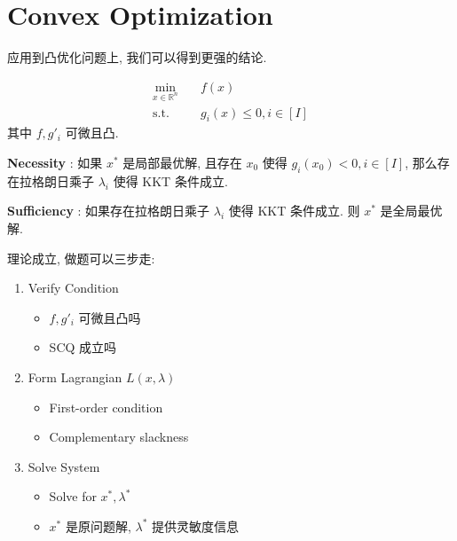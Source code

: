 \section{Convex Optimization}
应用到凸优化问题上, 我们可以得到更强的结论.
\begin{definition}
    \begin{align*}
        \min_{x \in \mathbb{R}^n} & \quad f(x) \\
        \text{s.t.} & \quad g_i(x) \leq 0, i\in [I] 
    \end{align*}
    其中 $f, g'_i$ 可微且凸. 
\end{definition}
\begin{proposition}
    \textbf{Necessity} : 如果 $x^*$ 是局部最优解, 且存在 $x_0$ 使得 $g_i(x_0) < 0, i \in [I]$, 那么存在拉格朗日乘子 $\lambda_i$ 使得 KKT 条件成立.

    \textbf{Sufficiency} : 如果存在拉格朗日乘子 $\lambda_i$ 使得 KKT 条件成立. 则 $x^*$ 是全局最优解.
\end{proposition}

理论成立, 做题可以三步走:
\begin{enumerate}
    \item Verify Condition
    \begin{itemize}
        \item $f,g'_i$ 可微且凸吗
        \item SCQ 成立吗
    \end{itemize}
    \item Form Lagrangian $L(x,\lambda)$
    \begin{itemize}
        \item First-order condition
        \item Complementary slackness
    \end{itemize}
    \item Solve System
    \begin{itemize}
        \item Solve for $x^*, \lambda^*$
        \item $x^*$ 是原问题解, $\lambda^*$ 提供灵敏度信息
    \end{itemize}
\end{enumerate}
%







